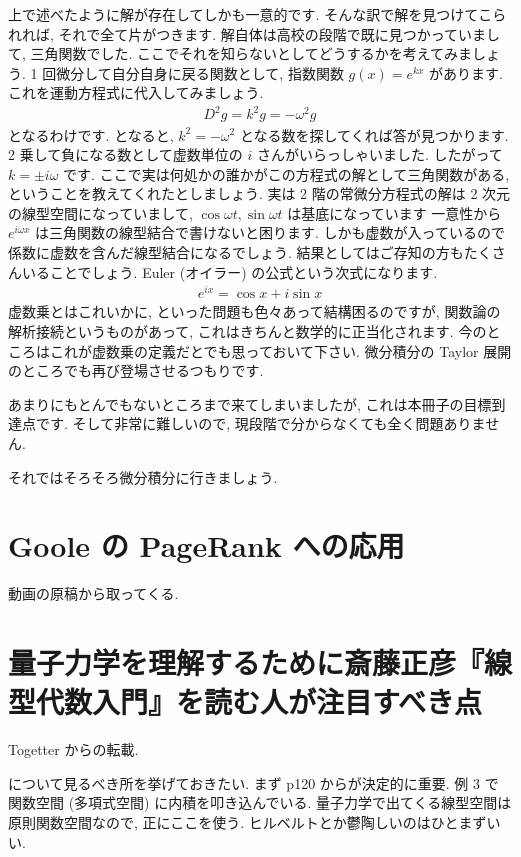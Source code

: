 \documentclass[openany, a4paper, oneside]{book}
\theoremstyle{break}
\theoremstyle{breakdefn}
\begin{document}
上で述べたように解が存在してしかも一意的です. そんな訳で解を見つけてこられれば, それで全て片がつきます.
解自体は高校の段階で既に見つかっていまして, 三角関数でした. ここでそれを知らないとしてどうするかを考えてみましょう.
1 回微分して自分自身に戻る関数として, 指数関数 $g (x)=e^{kx}$ があります. これを運動方程式に代入してみましょう.
    \begin{align}
        D^2 g = k^2 g = - \omega ^{2} g
    \end{align}
となるわけです. となると,  $k^2=-\omega^2$ となる数を探してくれば答が見つかります.
2 乗して負になる数として虚数単位の $i$ さんがいらっしゃいました. したがって $k=\pm i\omega$ です.
ここで実は何処かの誰かがこの方程式の解として三角関数がある, ということを教えてくれたとしましょう.
実は 2 階の常微分方程式の解は 2 次元の線型空間になっていまして,  $\cos \omega t,\sin \omega t$ は基底になっています
一意性から $e^{i\omega x}$ は三角関数の線型結合で書けないと困ります. しかも虚数が入っているので
係数に虚数を含んだ線型結合になるでしょう. 結果としてはご存知の方もたくさんいることでしょう.
Euler (オイラー) の公式という次式になります.
    \begin{align}
        e^{ix} = \cos x + i \sin x
    \end{align}
虚数乗とはこれいかに, といった問題も色々あって結構困るのですが,
関数論の解析接続というものがあって, これはきちんと数学的に正当化されます.
今のところはこれが虚数乗の定義だとでも思っておいて下さい.
微分積分の Taylor 展開のところでも再び登場させるつもりです.

あまりにもとんでもないところまで来てしまいましたが, これは本冊子の目標到達点です.
そして非常に難しいので, 現段階で分からなくても全く問題ありません.

それではそろそろ微分積分に行きましょう.
\chapter{Goole の PageRank への応用}
\label{sec-4-4}

動画の原稿から取ってくる.
\chapter{量子力学を理解するために斎藤正彦『線型代数入門』\cite{MasahikoSaitoh1}を読む人が注目すべき点}
\label{sec-4-5}

Togetter からの転載.

\cite{MasahikoSaitoh1} について見るべき所を挙げておきたい.
まず p120 からが決定的に重要.
例 3 で関数空間 (多項式空間) に内積を叩き込んでいる.
量子力学で出てくる線型空間は原則関数空間なので, 正にここを使う.
ヒルベルトとか鬱陶しいのはひとまずいい.
\end{document}

